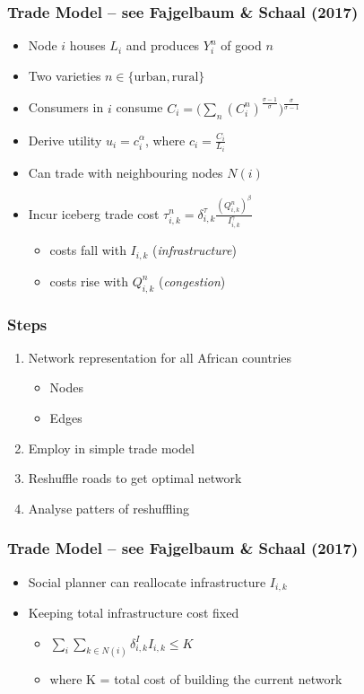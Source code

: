 \documentclass[]{beamer}   	%
\begin{document}
\begin{frame}
  \frametitle{Trade Model -- see Fajgelbaum \& Schaal (2017)}
  \begin{itemize}
    \item<1-> Node $i$ houses $L_{i}$ and produces $Y^{n}_{i}$ of good $n$
    \item<1-> Two varieties $n \in \{ \textrm{urban}, \textrm{rural} \}$
    \item<2-> Consumers in $i$ consume $C_{i} = \bigg( \sum_{n}^{} (C_{i}^{n})^{\frac{\sigma-1}{\sigma}}\bigg)^{\frac{\sigma}{\sigma-1}}$
    \item<2-> Derive utility $u_{i}=c_{i}^{\alpha}$, where $c_{i} = \frac{C_{i}}{L_{i}}$
    \item<3-> Can trade with neighbouring nodes $N(i)$
    \item<3-> Incur iceberg trade cost $\tau_{i,k}^{n} = \delta^{\tau}_{i,k} \frac{(Q_{i,k}^{n})^{\beta}}{I_{i,k}^{\gamma}}$
    \begin{itemize}
    	  \item<3-> costs fall with $I_{i,k}$ (\emph{infrastructure})
      \item<3-> costs rise with $Q_{i,k}^{n}$ (\emph{congestion})
    \end{itemize}
  \end{itemize}
\end{frame}

\begin{frame}
  \frametitle{Steps}
  \begin{enumerate}
    \item Network representation for all African countries
    \begin{itemize}
      \item Nodes
      \item Edges
    \end{itemize}
    \item Employ in simple trade model
    \item \alert{Reshuffle roads to get optimal network}
    \item Analyse patters of reshuffling
  \end{enumerate}
\end{frame}

\begin{frame}
  \frametitle{Trade Model -- see Fajgelbaum \& Schaal (2017)}
  \label{trade_model}
  \begin{itemize}
    \item Social planner can reallocate infrastructure $I_{i,k}$
    \item Keeping total infrastructure cost fixed
    \begin{itemize}
      \item $\sum_{i}^{}\sum_{k\in N(i)}^{}\delta^{I}_{i,k}I_{i,k} \leq K$
      \item where K = total cost of building the current network
    \end{itemize}
  \end{itemize}
  \hyperlink{backup:planners_problem}{}
\end{frame}
\end{document}
